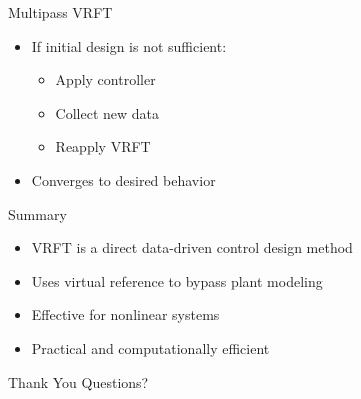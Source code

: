 \documentclass[hyperref={pdfpagemode=FullScreen},aspectratio=169]{beamer}
\begin{document}
\begin{frame}{Multipass VRFT}
\begin{itemize}
\item If initial design is not sufficient:
\begin{itemize}
\item Apply controller
\item Collect new data
\item Reapply VRFT
\end{itemize}
\item Converges to desired behavior
\end{itemize}
\end{frame}


\begin{frame}{Summary}
\begin{itemize}
\item VRFT is a direct data-driven control design method
\item Uses virtual reference to bypass plant modeling
\item Effective for nonlinear systems
\item Practical and computationally efficient
\end{itemize}
\end{frame}


\begin{frame}{Thank You}
Questions?
\end{frame}
\end{document}
